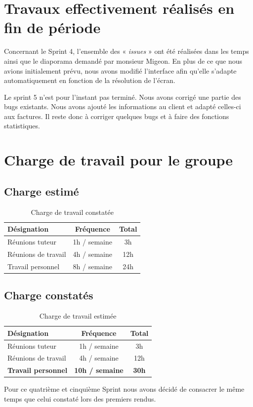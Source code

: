 \documentclass[12pt,a4paper,openany]{article}
\begin{document}
	\section{Travaux effectivement réalisés en fin de période}\label{work}
	Concernant le Sprint 4, l'ensemble des « \textit{issues} » ont été réalisées dans les temps ainsi que le diaporama demandé par monsieur Migeon.
	En plus de ce que nous avions initialement prévu, nous avons modifié l'interface afin qu'elle s'adapte automatiquement en fonction de la résolution de l'écran. 
	
	Le sprint 5 n'est pour l'instant pas terminé. Nous avons corrigé une partie des bugs existants. Nous avons ajouté les informations au client et adapté celles-ci aux factures. Il reste donc à corriger quelques bugs et à faire des fonctions statistiques. 

	\section{Charge de travail pour le groupe}
	\subsection{Charge estimé}
	\begin{table}[H]
		\centering
		\begin{tabular}{l|c|c}
			\textbf{Désignation} & \textbf{Fréquence} & \textbf{Total}\\
			\hline
			Réunions tuteur & 1h / semaine & 3h\\
			Réunions de travail & 4h / semaine & 12h\\
			Travail personnel & 8h / semaine & 24h
		\end{tabular}
		\caption{Charge de travail constatée}
	\end{table}

	\subsection{Charge constatés}
	\begin{table}[H]
		\centering
		\begin{tabular}{l|c|c}
			\textbf{Désignation} & \textbf{Fréquence} & \textbf{Total}\\
			\hline
			Réunions tuteur & 1h / semaine & 3h\\
			Réunions de travail & 4h / semaine & 12h\\
			\textbf{Travail personnel} & \textbf{10h / semaine} & \textbf{30h}
		\end{tabular}
		\caption{Charge de travail estimée}
	\end{table}
	Pour ce quatrième et cinquième Sprint nous avons décidé de consacrer le même temps que celui constaté lors des premiers rendus. 
	
\end{document}
